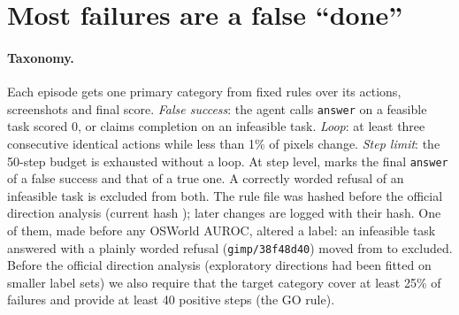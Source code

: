\section{Most failures are a false ``done''}
\label{sec:diag}

\paragraph{Taxonomy.} Each episode gets one primary category from fixed rules over its actions, screenshots and final score. \emph{False success}: the agent calls \texttt{answer} on a feasible task scored 0, or claims completion on an infeasible task. \emph{Loop}: at least three consecutive identical actions while less than 1\% of pixels change. \emph{Step limit}: the 50-step budget is exhausted without a loop. At step level, \fsp{} marks the final \texttt{answer} of a false success and \fsm{} that of a true one. A correctly worded refusal of an infeasible task is excluded from both. The rule file was hashed before the official direction analysis (current hash \texttt{\oswRulesSha}); later changes are logged with their hash. One of them, made before any OSWorld AUROC, altered a label: an infeasible task answered with a plainly worded refusal (\texttt{gimp/38f48d40}) moved from \fsp{} to excluded. %
Before the official direction analysis (exploratory directions had been fitted on smaller label sets) we also require that the target category cover at least 25\% of failures and provide at least 40 positive steps (the GO rule).

